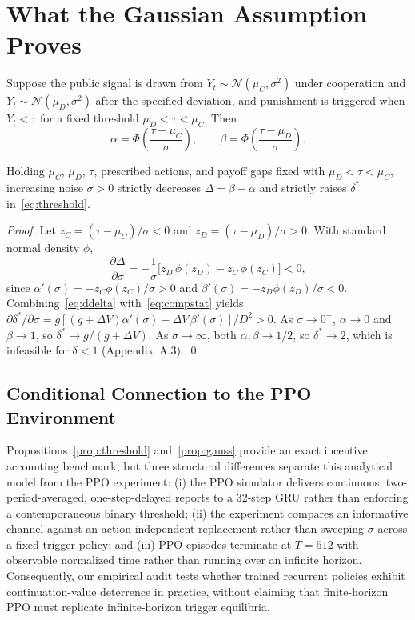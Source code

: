 \section{What the Gaussian Assumption Proves}

Suppose the public signal is drawn from $Y_t\sim\mathcal{N}(\mu_C,\sigma^2)$ under cooperation and $Y_t\sim\mathcal{N}(\mu_D,\sigma^2)$ after the specified deviation, and punishment is triggered when $Y_t<\tau$ for a fixed threshold $\mu_D<\tau<\mu_C$. Then
\[
\alpha = \Phi\!\left(\frac{\tau-\mu_C}{\sigma}\right),\qquad
\beta  = \Phi\!\left(\frac{\tau-\mu_D}{\sigma}\right).
\]

\begin{proposition}\label{prop:gauss}
Holding $\mu_C$, $\mu_D$, $\tau$, prescribed actions, and payoff gaps fixed with $\mu_D<\tau<\mu_C$, increasing noise $\sigma>0$ strictly decreases $\Delta=\beta-\alpha$ and strictly raises $\delta^*$ in~\eqref{eq:threshold}.
\end{proposition}

\begin{proof}
Let $z_C=(\tau-\mu_C)/\sigma < 0$ and $z_D=(\tau-\mu_D)/\sigma > 0$. With standard normal density $\phi$,
\begin{equation}\label{eq:ddelta}
\frac{\partial\Delta}{\partial\sigma}
= -\frac{1}{\sigma}\bigl[z_D\,\phi(z_D)-z_C\,\phi(z_C)\bigr] < 0,
\end{equation}
since $\alpha'(\sigma)=-z_C\phi(z_C)/\sigma > 0$ and $\beta'(\sigma)=-z_D\phi(z_D)/\sigma < 0$. Combining~\eqref{eq:ddelta} with~\eqref{eq:compstat} yields $\partial\delta^*/\partial\sigma = g[(g+\Delta V)\alpha'(\sigma)-\Delta V\,\beta'(\sigma)]/D^2 > 0$. As $\sigma\to 0^+$, $\alpha\to 0$ and $\beta\to 1$, so $\delta^*\to g/(g+\Delta V)$. As $\sigma\to\infty$, both $\alpha,\beta\to 1/2$, so $\delta^*\to 2$, which is infeasible for $\delta<1$ (Appendix~A.3). \qed
\end{proof}

\subsection{Conditional Connection to the PPO Environment}

Propositions~\ref{prop:threshold} and~\ref{prop:gauss} provide an exact incentive accounting benchmark, but three structural differences separate this analytical model from the PPO experiment: (i) the PPO simulator delivers continuous, two-period-averaged, one-step-delayed reports to a 32-step GRU rather than enforcing a contemporaneous binary threshold; (ii) the experiment compares an informative channel against an action-independent replacement rather than sweeping $\sigma$ across a fixed trigger policy; and (iii) PPO episodes terminate at $T=512$ with observable normalized time rather than running over an infinite horizon. Consequently, our empirical audit tests whether trained recurrent policies exhibit continuation-value deterrence in practice, without claiming that finite-horizon PPO must replicate infinite-horizon trigger equilibria.

